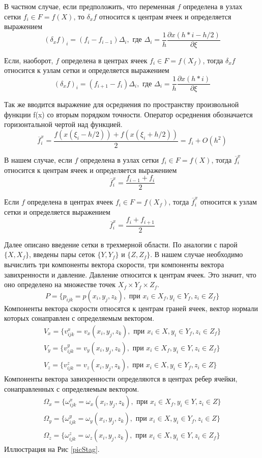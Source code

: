В частном случае, если предположить, что переменная $f$ определена в узлах сетки $ f_i \in F = f(X)$, то $\delta_x f$ относится к центрам ячеек и определяется выражением
$$
  (\delta_x f)_i = (f_i - f_{i-1}) \Delta_i, \text{ где } \Delta_i =  \frac{1}{h}\frac{\partial x(h*i - h/2)}{\partial \xi}
$$

Если, наоборот, $f$ определена в центрах ячеек $ f_i \in F = f(X_f)$, тогда $\delta_x f$
относится к узлам сетки и определяется выражением
$$
  (\delta_x f)_i = (f_{i+1} - f_i) \Delta_i, \text{ где } \Delta_i  = \frac{1}{h}\frac{\partial x(h*i)}{\partial \xi}
$$

Так же вводится выражение для осреднения по пространству произвольной функции f(x) со вторым порядком точности. Оператор осреднения обозначается горизонтальной чертой над функцией. 
$$
  \overline{f}^x_i = \frac{f(x(\xi_i - h/2)) + f(x(\xi_i + h/2))}{2} = f_i + O(h^2)
$$

В нашем случае, если $f$ определена в узлах сетки $f_i \in F = f(X)$, тогда $\overline{f}^x_i$ относится к центрам ячеек и определяется выражением
$$
  \overline{f}^x_i = \frac{f_{i-1} + f_{i}}{2}
$$

Если $f$ определена в центрах ячеек $f_i \in F = f(X_f)$, тогда $\overline{f}^x_i$ относится к узлам сетки и определяется выражением
$$
  \overline{f}^x_i = \frac{f_i + f_{i+1}}{2}
$$


Далее описано введение сетки в трехмерной области. 
По аналогии с парой $\{X,X_f\}$, введены пары сеток $\{Y,Y_f\}$ и $\{Z,Z_f\}$. В нашем случае необходимо вычислить три компоненты вектора скорости, три компоненты вектора завихренности и давление. Давление относится к центрам ячеек. Это значит, что оно определено на множестве точек $X_f \times Y_f \times Z_f$.
$$
  P = \{p_{ijk} = p(x_i,y_j,z_k), \text{ при } x_i \in X_f, y_i \in Y_f, z_i \in Z_f\}
$$
Компоненты вектора скорости относятся к центрам граней ячеек, вектор нормали которых сонаправлен с определяемым вектором.
\begin{gather*}
  V_x = \{ v^x_{ijk} = v_x(x_i,y_j,z_k), \text{ при } x_i \in X, y_i \in Y_f, z_i \in Z_f \} \\
  V_y = \{ v^y_{ijk} = v_y(x_i,y_j,z_k), \text{ при } x_i \in X_f, y_i \in Y, z_i \in Z_f \} \\
  V_z = \{ v^z_{ijk} = v_z(x_i,y_j,z_k), \text{ при } x_i \in X, y_i \in Y_f, z_i \in Z \}
\end{gather*}
Компоненты вектора завихренности определяются в центрах ребер ячейки, сонаправленных с определяемым вектором. 
\begin{gather*}
  \Omega_x = \{ \omega^x_{ijk} = \omega_x(x_i,y_j,z_k), \text{ при } x_i \in X_f, y_i \in Y, z_i \in Z \} \\
  \Omega_y = \{ \omega^y_{ijk} = \omega_y(x_i,y_j,z_k), \text{ при } x_i \in X, y_i \in Y_f, z_i \in Z \} \\
  \Omega_z = \{ \omega^z_{ijk} = \omega_z(x_i,y_j,z_k), \text{ при } x_i \in X, y_i \in Y, z_i \in Z_f \}
\end{gather*}
Иллюстрация на Рис \ref{picStag}.


